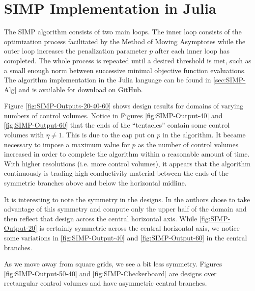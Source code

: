 \section{SIMP Implementation in Julia}

The SIMP algorithm consists of two main loops. The inner loop consists of the optimization process facilitated by the Method of Moving Asymptotes while the outer loop increases the penalization parameter $p$ after each inner loop has completed. The whole process is repeated until a desired threshold is met, such as a small enough norm between successive minimal objective function evaluations. The algorithm implementation in the Julia language can be found in \ref{sec:SIMP-Alg} and is available for download on \href{https://github.com/mikwnelson/julia-simp-optimization}{GitHub}.

Figure \ref{fig:SIMP-Outputs-20-40-60} shows design results for domains of varying numbers of control volumes. Notice in Figures \ref{fig:SIMP-Output-40} and \ref{fig:SIMP-Output-60} that the ends of the ``tentacles'' contain some control volumes with $\eta\neq 1$. This is due to the cap put on $p$ in the algorithm. It became necessary to impose a maximum value for $p$ as the number of control volumes increased in order to complete the algorithm within a reasonable amount of time. With higher resolutions (i.e. more control volumes), it appears that the algorithm continuously is trading high conductivity material between the ends of the symmetric branches above and below the horizontal midline.

It is interesting to note the symmetry in the designs. In \cite{Marck2012} the authors chose to take advantage of this symmetry and compute only the upper half of the domain and then reflect that design across the central horizontal axis. While \ref{fig:SIMP-Output-20} is certainly symmetric across the central horizontal axis, we notice some variations in \ref{fig:SIMP-Output-40} and \ref{fig:SIMP-Output-60} in the central branches.

As we move away from square grids, we see a bit less symmetry. Figures \ref{fig:SIMP-Output-50-40} and \ref{fig:SIMP-Checkerboard} are designs over rectangular control volumes and have asymmetric central branches.

